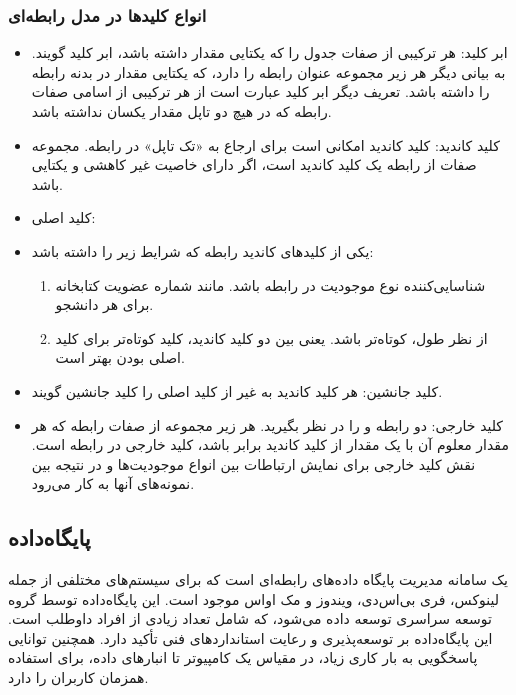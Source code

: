 {{ 
\subsubsection{انواع کلیدها در مدل رابطه‌ای}

\begin{itemize}
  	\item ابر کلید: هر ترکیبی از صفات جدول را که یکتایی مقدار داشته باشد، ابر کلید گویند. به بیانی دیگر هر زیر مجموعه عنوان رابطه را دارد، که یکتایی مقدار در بدنه رابطه را داشته باشد. تعریف دیگر ابر کلید عبارت است از هر ترکیبی از اسامی صفات رابطه که در هیچ دو تاپل مقدار یکسان نداشته باشد.

  	\item کلید کاندید: کلید کاندید امکانی است برای ارجاع به «تک تاپل» در رابطه. مجموعه صفات  از رابطه یک کلید کاندید است، اگر دارای خاصیت غیر کاهشی و یکتایی باشد.

  	\item کلید اصلی: 
  	\item یکی از کلیدهای کاندید رابطه که شرایط زیر را داشته باشد:
	\begin{enumerate}
		\item شناسایی‌کننده نوع موجودیت در رابطه باشد. مانند شماره عضویت کتابخانه برای هر دانشجو.
		\item از نظر طول، کوتاه‌تر باشد. یعنی بین دو کلید کاندید، کلید کوتاه‌تر برای کلید اصلی بودن بهتر است.
	\end{enumerate}
  	\item کلید جانشین: هر کلید کاندید به غیر از کلید اصلی را کلید جانشین گویند.
  	\item کلید خارجی: دو رابطه  و  را در نظر بگیرید. هر زیر مجموعه از صفات رابطه که هر مقدار معلوم آن با یک مقدار از کلید کاندید برابر باشد، کلید خارجی در رابطه است. نقش کلید خارجی برای نمایش ارتباطات بین انواع موجودیت‌ها و در نتیجه بین نمونه‌های آنها به کار می‌رود.

\end{itemize}


 
\subsection{پایگاه‌داده }
 یک سامانه مدیریت پایگاه داده‌های رابطه‌ای است که برای سیستم‌های مختلفی از جمله لینوکس، فری بی‌اس‌دی، ویندوز و مک اواس موجود است. این پایگاه‌داده توسط گروه توسعه سراسری  توسعه داده می‌شود، که شامل تعداد زیادی از افراد داوطلب است. این پایگاه‌داده بر توسعه‌پذیری و رعایت استانداردهای فنی تأکید دارد. همچنین توانایی پاسخگویی به بار کاری زیاد، در مقیاس یک کامپیوتر تا انبارهای داده، برای استفاده همزمان کاربران را دارد.
 
}}
